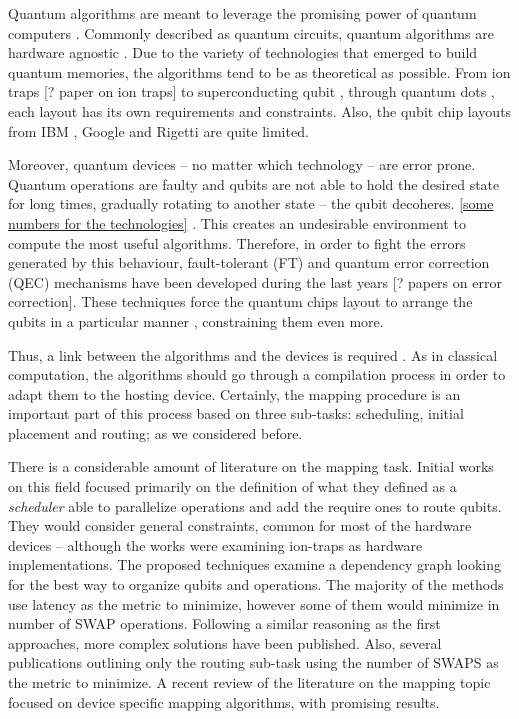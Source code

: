 \documentclass[11pt]{article}
\author{Daniel Moreno Manzano}
\date{\today}
\title{}
\begin{document}
Quantum algorithms are meant to leverage the promising power of quantum computers \cite{coles18:quant_algor_implem_begin}.
Commonly described as quantum circuits, quantum algorithms are hardware agnostic \cite{Nielsen_2009}.
Due to the variety of technologies that emerged to build quantum memories, the algorithms tend to be as theoretical as possible.
From ion traps [? paper on ion traps] to superconducting qubit \cite{Barends_2014}, through quantum dots \cite{Hill_2015,Li_2018}, each layout has its own requirements and constraints.
Also, the qubit chip layouts from IBM \cite{IBM_QX}, Google \cite{boixo16:charac_quant_suprem_near_term_devic} and Rigetti \cite{Sete_2016} are quite limited.

Moreover, quantum devices -- no matter which technology -- are error prone.
Quantum operations are faulty and qubits are not able to hold the desired state for long times, gradually rotating to another state -- the qubit decoheres.
\uline{[some numbers for the technologies]} \cite{O_Brien_2017}.
This creates an undesirable environment to compute the most useful algorithms.
Therefore, in order to fight the errors generated by this behaviour, fault-tolerant (FT) and quantum error correction (QEC) mechanisms have been developed during the last years \cite{Nielsen_2009} [? papers on error correction].
These techniques force the quantum chips layout to arrange the qubits in a particular manner \cite{Versluis_2017}, constraining them even more.

Thus, a link between the algorithms and the devices is required \cite{Fu_2016}.
As in classical computation, the algorithms should go through a compilation process in order to adapt them to the hosting device.
Certainly, the mapping procedure is an important part of this process based on three sub-tasks: scheduling, initial placement and routing; as we considered before.

There is a considerable amount of literature on the mapping task.
Initial works on this field \cite{Metodi_2006,Whitney_2007,Bahreini_2015} focused primarily on the definition of what they defined as a \emph{scheduler} able to parallelize operations and add the require ones to route qubits.
They would consider general constraints, common for most of the hardware devices -- although the works were examining ion-traps as hardware implementations.
The proposed techniques examine a dependency graph looking for the best way to organize qubits and operations.
The majority of the methods use latency as the metric to minimize, however some of them \cite{Farghadan_2017} would minimize in number of SWAP operations.
Following a similar reasoning as the first approaches, more complex solutions \cite{booth18:compar_integ_const_progr_tempor} have been published.
Also, several publications \cite{Lye_2015,Wille_2016} outlining only the routing sub-task using the number of SWAPS as the metric to minimize.
A recent review of the literature on the mapping topic \cite{zulehner17:effic_method_mappin_quant_circuit,Siraichi_2018,mckay18:qiskit_backen_specif_openq_openp_exper,Dueck_2018,Venturelli_2018} focused on device specific mapping algorithms, with promising results.
\end{document}
